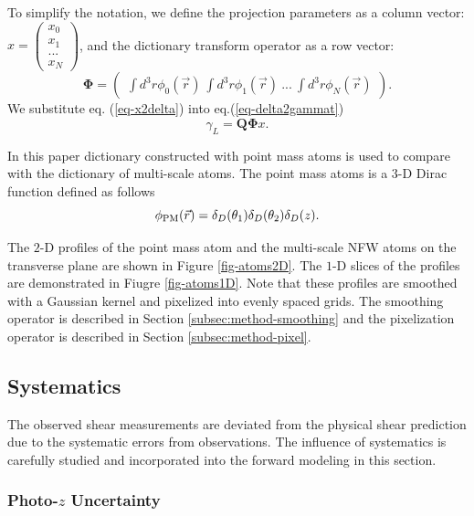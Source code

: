 \documentclass[twocolumn]{aastex62}
\begin{document}
To simplify the notation, we define the projection parameters as a column vector:
$x=\begin{pmatrix}
x_{0}\\
x_{1}\\
...\\
x_{N}
\end{pmatrix}$,
and the dictionary transform operator as a row vector:
\begin{equation}
\mathbf{\Phi}=\begin{pmatrix}
\int d^3r\phi_0(\vec{r}) ~\int d^3r \phi_1(\vec{r})~ ...~\int d^3r \phi_{N}(\vec{r})
\end{pmatrix}.
\end{equation}
We substitute eq. (\ref{eq-x2delta}) into eq.(\ref{eq-delta2gammat})
\begin{equation}\label{eq-x2gammat}
\gamma_L=\mathbf{Q}\mathbf{\Phi} x.
\end{equation}

In this paper dictionary constructed with point mass atoms is used to compare with the dictionary of multi-scale atoms.
The point mass atoms is a $3$-D Dirac function defined as follows
\begin{equation}
\phi_{\rm{PM}}(\vec{r})= \delta_D(\theta_1) \delta_D(\theta_2) \delta_D(z).
\end{equation}

The $2$-D profiles of the point mass atom and the multi-scale NFW atoms on the transverse plane are shown in Figure 
\ref{fig-atoms2D}. The $1$-D slices of the profiles are demonstrated in Fiugre \ref{fig-atoms1D}. Note that these profiles 
are smoothed with a Gaussian kernel and pixelized into evenly spaced grids. The smoothing operator is described in 
Section \ref{subsec:method-smoothing} and the pixelization operator is described in Section \ref{subsec:method-pixel}.

\subsection{Systematics}
\label{subsec:method-Systematics}

The observed shear measurements are deviated from the physical shear prediction due to the systematic 
errors from observations. The influence of systematics is carefully studied and incorporated into the forward 
modeling in this section.

\subsubsection{Photo-$z$ Uncertainty}
\label{subsec:method-photoz}
\end{document}
